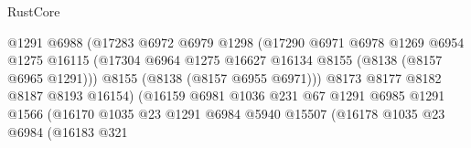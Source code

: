\begin{lexlean}{RustCore}
\begin{coremodule}
                                          @1291
                                          @6988
                                          (@17283
                                            @6972
                                            @6979
                                            @1298
                                            (@17290
                                              @6971
                                              @6978
                                              @1269
                                              @6954
                                              @1275
                                              @16115
                                              (@17304
                                                @6964
                                                @1275
                                                @16627
                                                @16134
                                                @8155
                                                (@8138 (@8157 @6965 @1291)))
                                              @8155
                                              (@8138 (@8157 @6955 @6971)))
                                            @8173
                                            @8177
                                            @8182
                                            @8187
                                            @8193
                                            @16154)
                                          (@16159
                                            @6981
                                            @1036
                                            @231
                                            @67
                                            @1291
                                            @6985
                                            @1291
                                            @1566
                                            (@16170
                                              @1035
                                              @23
                                              @1291
                                              @6984
                                              @5940
                                              @15507
                                              (@16178
                                                @1035
                                                @23
                                                @6984
                                                (@16183
                                                  @321

\end{coremodule}
\end{lexlean}
